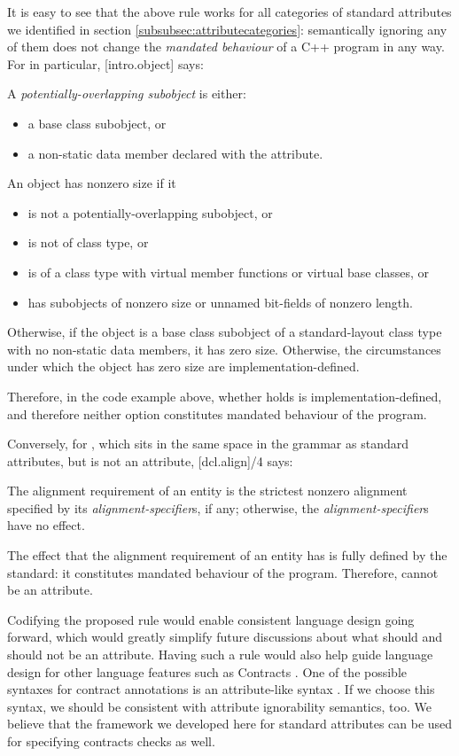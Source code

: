 It is easy to see that the above rule works for all categories of standard attributes we identified in section \ref{subsubsec:attributecategories}: semantically ignoring any of them does not change the \emph{mandated behaviour} of a C++ program in any way. For  in particular, [intro.object] says:
\begin{adjustwidth}{0.5cm}{0.5cm}
A \emph{potentially-overlapping subobject} is either:
\begin{itemize}
\item a base class subobject, or
\item a non-static data member declared with the  attribute.
\end{itemize}
An object has nonzero size if it
\begin{itemize}
\item is not a potentially-overlapping subobject, or
\item is not of class type, or
\item is of a class type with virtual member functions or virtual base classes, or
\item has subobjects of nonzero size or unnamed bit-fields of nonzero length.
\end{itemize}
Otherwise, if the object is a base class subobject of a standard-layout class type with no non-static data members, it has zero size. Otherwise, the circumstances under which the object has zero size are implementation-defined. 
\end{adjustwidth}

Therefore, in the code example above, whether  holds is implementation-defined, and therefore neither option constitutes mandated behaviour of the program.

Conversely, for , which sits in the same space in the grammar as standard attributes, but is not an attribute, [dcl.align]/4 says:
\begin{adjustwidth}{0.5cm}{0.5cm}
The alignment requirement of an entity is the strictest nonzero alignment specified by its \emph{alignment-specifier}s, if any; otherwise, the \emph{alignment-specifier}s have no effect.
\end{adjustwidth}
The effect that the alignment requirement of an entity has is fully defined by the standard: it constitutes mandated behaviour of the program. Therefore,  cannot be an attribute.

Codifying the proposed rule would enable consistent language design going forward, which would greatly simplify future discussions about what should and should not be an attribute. Having such a rule would also help guide language design for other language features such as Contracts \cite{P2521R2}. One of the possible syntaxes for contract annotations is an attribute-like syntax \cite{P2487R0}. If we choose this syntax, we should be consistent with attribute ignorability semantics, too. We believe that the framework we developed here for standard attributes can be used for specifying contracts checks as well.

